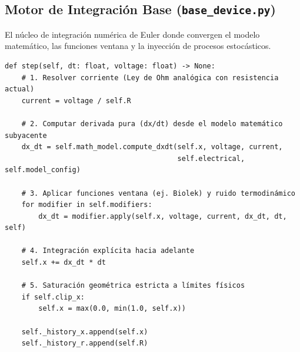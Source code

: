 \subsection{Motor de Integración Base (\texttt{base\_device.py})}
El núcleo de integración numérica de Euler donde convergen el modelo matemático, las funciones ventana y la inyección de procesos estocásticos.

\begin{verbatim}
def step(self, dt: float, voltage: float) -> None:
    # 1. Resolver corriente (Ley de Ohm analógica con resistencia actual)
    current = voltage / self.R
    
    # 2. Computar derivada pura (dx/dt) desde el modelo matemático subyacente
    dx_dt = self.math_model.compute_dxdt(self.x, voltage, current, 
                                         self.electrical, self.model_config)
    
    # 3. Aplicar funciones ventana (ej. Biolek) y ruido termodinámico
    for modifier in self.modifiers:
        dx_dt = modifier.apply(self.x, voltage, current, dx_dt, dt, self)
        
    # 4. Integración explícita hacia adelante
    self.x += dx_dt * dt
    
    # 5. Saturación geométrica estricta a límites físicos
    if self.clip_x:
        self.x = max(0.0, min(1.0, self.x))
        
    self._history_x.append(self.x)
    self._history_r.append(self.R)
\end{verbatim}
